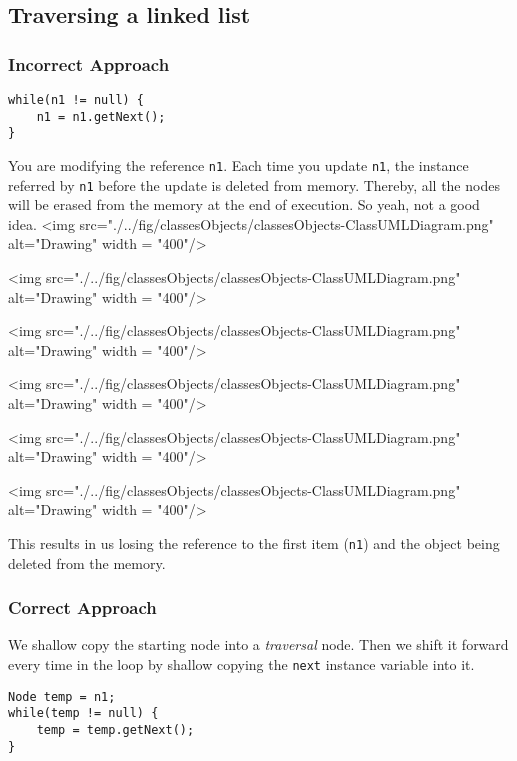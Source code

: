 \newpage

\subsection{Traversing a linked list}

\subsubsection{Incorrect Approach}

\begin{lstlisting}
while(n1 != null) {
	n1 = n1.getNext();
}
\end{lstlisting}

You are modifying the reference \texttt{n1}. Each time you update \texttt{n1}, the instance referred by \texttt{n1} before the update is deleted from memory. Thereby, all the nodes will be erased from the memory at the end of execution. So yeah, not a good idea.
\vskip 0.5cm
<img src="./../fig/classesObjects/classesObjects-ClassUMLDiagram.png" alt="Drawing" width = "400"/>
\vskip 0.3cm

<img src="./../fig/classesObjects/classesObjects-ClassUMLDiagram.png" alt="Drawing" width = "400"/>
\vskip 0.3cm


<img src="./../fig/classesObjects/classesObjects-ClassUMLDiagram.png" alt="Drawing" width = "400"/>
\vskip 0.3cm

<img src="./../fig/classesObjects/classesObjects-ClassUMLDiagram.png" alt="Drawing" width = "400"/>
\vskip 0.3cm

<img src="./../fig/classesObjects/classesObjects-ClassUMLDiagram.png" alt="Drawing" width = "400"/>
\vskip 0.3cm

<img src="./../fig/classesObjects/classesObjects-ClassUMLDiagram.png" alt="Drawing" width = "400"/>
\vskip 0.5cm

This results in us losing the reference to the first item (\texttt{n1}) and the object being deleted from the memory.
\newpage

\subsubsection{Correct Approach}

We shallow copy the starting node into a \textit{traversal} node. Then we shift it forward every time in the loop by shallow copying the \texttt{next} instance variable into it. 

\begin{lstlisting}
Node temp = n1;
while(temp != null) {
	temp = temp.getNext();
}
\end{lstlisting}

